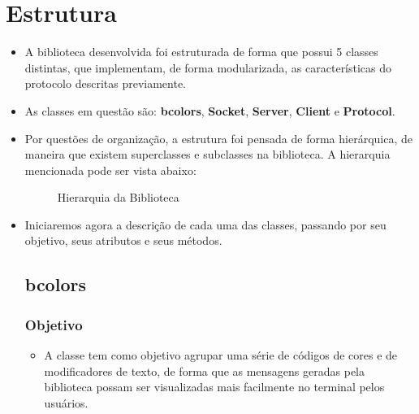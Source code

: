 \documentclass[10pt]{article}
\begin{document}
\section{Estrutura}
    \begin{itemize}
    \item A biblioteca desenvolvida foi estruturada de forma que possui 5 classes distintas, que implementam, de forma modularizada, as características do protocolo descritas previamente. 
    \item As classes em questão são: \textbf{bcolors}, \textbf{Socket}, \textbf{Server}, \textbf{Client} e \textbf{Protocol}.
    \item Por questões de organização, a estrutura foi pensada de forma hierárquica, de maneira que existem superclasses e subclasses na biblioteca. A hierarquia mencionada pode ser vista abaixo:
    
    \begin{figure}[ht]
    \caption{Hierarquia da Biblioteca}
    \label{fig:diagrama}
    \end{figure}
    
    \item Iniciaremos agora a descrição de cada uma das classes, passando por seu objetivo, seus atributos e seus métodos.

    \subsection{\Large bcolors}
        \subsubsection{\large Objetivo}
            \begin{itemize}
            \item A classe tem como objetivo agrupar uma série de códigos de cores e de modificadores de
            texto, de forma que as mensagens geradas pela biblioteca possam ser visualizadas mais
            facilmente no terminal pelos usuários.
            \end{itemize}

\end{itemize}
\end{document}
